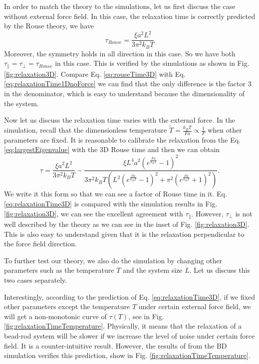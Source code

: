 In order to match the theory to the simulations, let us first discuss the case without external force field. In this case, the relaxation time is correctly predicted by the Rouse theory, we have
\begin{equation}
    \label{eq:rouseTime3D}
    \tau_{Rouse} = \frac{\xi a^2 L^2}{3\pi^2 k_B T}
\end{equation}
Moreover, the symmetry holds in all direction in this case. So we have both $\tau_{\parallel} = \tau_{\perp} = \tau_{Rouse}$ in this case. This is verified by the simulations as shown in Fig. \ref{fig:relaxation3D}. Compare Eq. \eqref{eq:rouseTime3D} with Eq. \eqref{eq:relaxationTime1DnoForce} we can find that the only difference is the factor $3$ in the denominator, which is easy to understand because the dimensionality of the system. 

Now let us discuss the relaxation time varies with the external force. In the simulation, recall that the dimensionless temperature $\tilde{T} = \frac{k_B T}{Fa}  \propto \frac{1}{F}$ when other parameters are fixed. It is reasonable to calibrate the relaxation from the Eq. \eqref{eq:largestEigenvalue} with the 3D Rouse time and then we can obtain
\begin{equation}
    \label{eq:relaxationTime3D}
    \tau = \frac{\xi a^2 L^2}{3 \pi^2 k_{B} T} - \frac{\xi L^4 a^2 \left(e^{\frac{F a}{k_{B} T}} - 1\right)^2} {3 \pi^2 k_{B} T \left(L^2 \left(e^{\frac{F a}{k_{B}T}} - 1\right)^2 + \pi^2 \left(e^{\frac{F a}{k_{B}T}} + 1\right)^2\right)}.
\end{equation}
We write it this form so that we can see a factor of Rouse time in it. Eq. \eqref{eq:relaxationTime3D} is compared with the simulation results in Fig. \ref{fig:relaxation3D}, we can see the excellent agreement with $\tau_{\parallel}$. However, $\tau_{\perp}$ is not well described by the theory as we can see in the inset of Fig. \ref{fig:relaxation3D}. This is also easy to understand given that it is the relaxation perpendicular to the force field direction. 

To further test our theory, we also do the simulation by changing other parameters such as the temperature $T$ and the system size $L$. Let us discuss this two cases separately.  

Interestingly, according to the prediction of Eq. \eqref{eq:relaxationTime3D}, if we fixed other parameters except the temperature $T$ under certain external force field, we will get a non-monotonic curve of $\tau(T)$, see in Fig. \ref{fig:relaxationTimeTemperature}. Physically, it means that the relaxation of a bead-rod system will be slower if we increase the level of noise under certain force field.  It is a counter-intuitive result. However, the results of from the BD simulation verifies this prediction, show in Fig. \ref{fig:relaxationTimeTemperature}. 

